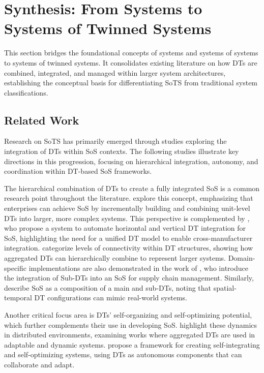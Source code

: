 

\section{Synthesis: From Systems to Systems of Twinned Systems}\label{sec:background-sots-synthesis}

This section bridges the foundational concepts of systems and systems of systems to systems of twinned systems. It consolidates existing literature on how DTs are combined, integrated, and managed within larger system architectures, establishing the conceptual basis for differentiating SoTS from traditional system classifications.

\subsection{Related Work}\label{subsec:background-sots-related-work}

Research on SoTS has primarily emerged through studies exploring the integration of DTs within SoS contexts. The following studies illustrate key directions in this progression, focusing on hierarchical integration, autonomy, and coordination within DT-based SoS frameworks.

The hierarchical combination of DTs to create a fully integrated SoS is a common research point throughout the literature. \citet{tao2019digital} explore this concept, emphasizing that enterprises can achieve SoS by incrementally building and combining unit-level DTs into larger, more complex systems. This perspective is complemented by \citet{gill2024toward}, who propose a system to automate horizontal and vertical DT integration for SoS, highlighting the need for a unified DT model to enable cross-manufacturer integration. \citet{schroeder2021digital} categorize levels of connectivity within DT structures, showing how aggregated DTs can hierarchically combine to represent larger systems. Domain-specific implementations are also demonstrated in the work of \citet{zhang2021supply}, who introduce the integration of Sub-DTs into an SoS for supply chain management. Similarly, \citet{dietz2020digital} describe SoS as a composition of a main and sub-DTs, noting that spatial-temporal DT configurations can mimic real-world systems.

Another critical focus area is DTs' self-organizing and self-optimizing potential, which further complements their use in developing SoS. \citet{ghanbarifard2023digital} highlight these dynamics in distributed environments, examining works where aggregated DTs are used in adaptable and dynamic systems. \citet{esterle2021digital} propose a framework for creating self-integrating and self-optimizing systems, using DTs as autonomous components that can collaborate and adapt.

